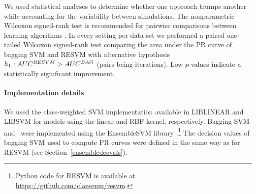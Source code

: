 We used statistical analyses to determine whether one approach trumps another while accounting for the variability between simulations. %
The nonparametric Wilcoxon signed-rank test is recommended for pairwise comparisons between learning algorithms \citep{demvsar2006statistical}. In every setting per data set we performed a paired one-tailed Wilcoxon signed-rank test comparing the area under the PR curve of bagging SVM and RESVM with alternative hypothesis $h_1: AUC^{RESVM} > AUC^{BAG}$ (pairs being iterations). Low $p$-values indicate a statistically significant improvement. 


\paragraph{Implementation details}
We used the class-weighted SVM implementation available in LIBLINEAR \citep{fan2008liblinear} and LIBSVM \citep{CC01a} for models using the linear and RBF kernel, respectively. Bagging SVM and \resvm\ were implemented using the EnsembleSVM library \citep{claesen14}.\footnote{Python code for RESVM is available at \url{https://github.com/claesenm/resvm}.} The decision values of bagging SVM used to compute PR curves were defined in the same way as for RESVM (see Section~\ref{ensembledecvals}).




